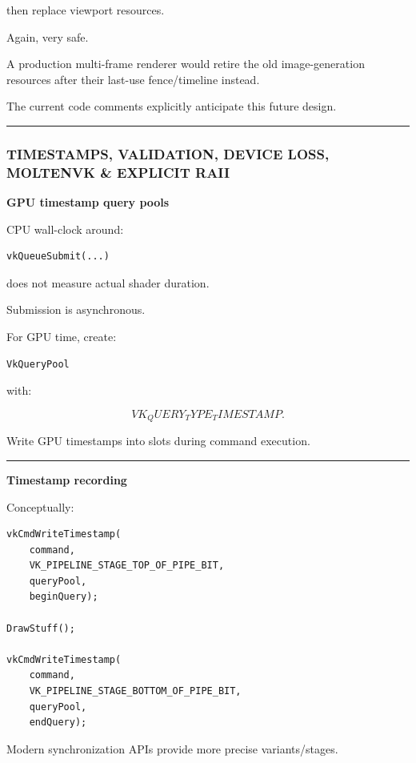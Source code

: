 then replace viewport resources.

Again, very safe.

A production multi-frame renderer would retire the old image-generation resources after their last-use fence/timeline instead.

The current code comments explicitly anticipate this future design.

\begin{center}\rule{0.5\linewidth}{0.5pt}\end{center}

\subsubsection{TIMESTAMPS, VALIDATION, DEVICE LOSS, MOLTENVK \& EXPLICIT RAII}\label{timestamps-validation-device-loss-moltenvk-explicit-raii}

\textbf{GPU timestamp query pools}

CPU wall-clock around:

\begin{verbatim}
vkQueueSubmit(...)
\end{verbatim}

does not measure actual shader duration.

Submission is asynchronous.

For GPU time, create:

\begin{verbatim}
VkQueryPool
\end{verbatim}

with:

\[
VK_QUERY_TYPE_TIMESTAMP.
\]

Write GPU timestamps into slots during command execution.

\begin{center}\rule{0.5\linewidth}{0.5pt}\end{center}

\textbf{Timestamp recording}

Conceptually:

\begin{verbatim}
vkCmdWriteTimestamp(
    command,
    VK_PIPELINE_STAGE_TOP_OF_PIPE_BIT,
    queryPool,
    beginQuery);

DrawStuff();

vkCmdWriteTimestamp(
    command,
    VK_PIPELINE_STAGE_BOTTOM_OF_PIPE_BIT,
    queryPool,
    endQuery);
\end{verbatim}

Modern synchronization APIs provide more precise variants/stages.

